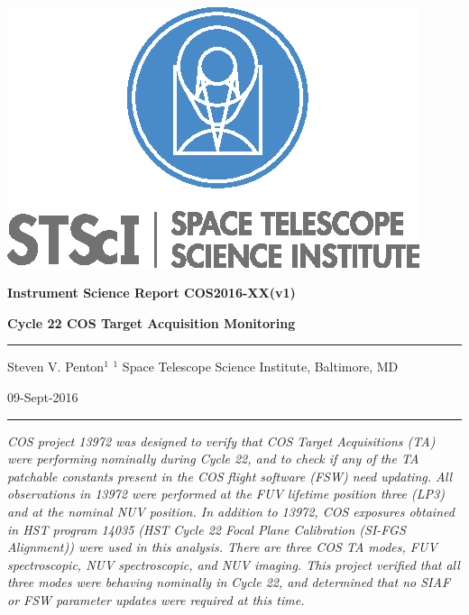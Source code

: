\documentclass[12pt]{reportj}
\begin{document}
~\\

\vspace{-2.4cm}
\noindent\includegraphics*[width=0.295\linewidth]{new_st_logo.eps}

\vspace{-0.4cm}

\begin{flushright}
{\bf Instrument Science Report COS2016-XX(v1)}

\vspace{1.1cm}

{\bf\Huge Cycle 22 COS Target Acquisition Monitoring}

\rule{0.25\linewidth}{0.5pt}

\vspace{0.5cm}
Steven V. Penton$^1$
\linebreak
\newline
\footnotesize{$^1$ Space Telescope Science Institute, Baltimore, MD}
\vspace{0.5cm}

09-Sept-2016
\end{flushright}

\vspace{0.1cm}
\noindent\rule{\linewidth}{1.0pt}

{\it \noindent
COS project 13972 was designed to verify that COS Target Acquisitions (TA) were performing
nominally during Cycle 22, and to check if any of the TA patchable constants present in the COS flight software (FSW) need
updating. All observations in 13972 were performed at the FUV lifetime position three (LP3) and at the nominal NUV position.
In addition to 13972, COS exposures obtained in HST program 14035 (HST Cycle 22 Focal Plane Calibration (SI-FGS Alignment)) were used in this analysis.
There are three COS TA modes, FUV spectroscopic, NUV spectroscopic, and NUV imaging.
This project verified that all three modes were behaving nominally in Cycle 22, and determined that no SIAF or FSW
parameter updates were required at this time. }
\end{document}
